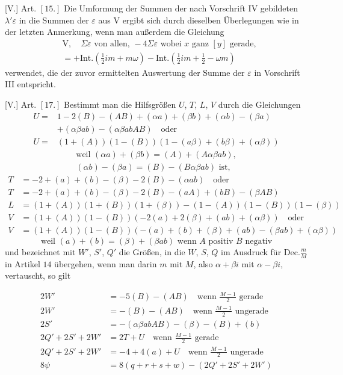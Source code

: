 [V.] Art. $[15.]$ Die Umformung der Summen der nach Vorschrift IV gebildeten $\lambda'\varepsilon$ in die Summen der $\varepsilon$ aus V ergibt sich durch dieselben Überlegungen wie in der letzten Anmerkung, wenn man außerdem die Gleichung
\[
\begin{aligned}
&\mathrm V,\quad\Sigma\varepsilon\text{ von allen, }-4\Sigma\varepsilon\text{ wobei }x\text{ ganz }[y]\text{ gerade},\\
&=+\mathrm{Int.}(\tfrac12im+m\omega)-\mathrm{Int.}(\tfrac12im+\tfrac12-\omega m)
\end{aligned}
\]
verwendet, die der zuvor ermittelten Auswertung der Summe der $\varepsilon$ in Vorschrift III entspricht.

[V.] Art. $[17.]$ Bestimmt man die Hilfsgrößen $U$, $T$, $L$, $V$ durch die Gleichungen
\[
\begin{aligned}
U={}&1-2(B)-(AB)+(\alpha a)+(\beta b)+(\alpha b)-(\beta a)\\
&+(\alpha\beta ab)-(\alpha\beta abAB)\quad\text{oder}\\
U={}&(1+(A))(1-(B))(1-(a\beta)+(b\beta)+(\alpha\beta))
\end{aligned}
\]
\[
\begin{gathered}
\text{weil }(\alpha a)+(\beta b)=(A)+(A\alpha\beta ab),\\
(\alpha b)-(\beta a)=(B)-(B\alpha\beta ab)\text{ ist},
\end{gathered}
\]
\[
\begin{aligned}
T&=-2+(a)+(b)-(\beta)-2(B)-(\alpha ab)\quad\text{oder}\\
T&=-2+(a)+(b)-(\beta)-2(B)-(aA)+(bB)-(\beta AB)\\
L&=(1+(A))(1+(B))(1+(\beta))-(1-(A))(1-(B))(1-(\beta))\\
V&=(1+(A))(1-(B))(-2(a)+2(\beta)+(ab)+(\alpha\beta))\quad\text{oder}\\
V&=(1+(A))(1-(B))(-(a)+(b)+(\beta)+(ab)-(\beta ab)+(\alpha\beta))
\end{aligned}
\]
\[
\text{weil }(a)+(b)=(\beta)+(\beta ab)\text{ wenn }A\text{ positiv }B\text{ negativ}
\]
und bezeichnet mit $W'$, $S'$, $Q'$ die Größen, in die $W$, $S$, $Q$ im Ausdruck für $\mathrm{Dec.}\frac mM$ in Artikel $14$ übergehen, wenn man darin $m$ mit $M$, also $\alpha+\beta i$ mit $\alpha-\beta i$, vertauscht, so gilt

\[
\begin{aligned}
2W'&=-5(B)-(AB)\quad\text{wenn }\frac{M-1}{2}\text{ gerade}\\
2W'&=-(B)-(AB)\quad\text{wenn }\frac{M-1}{2}\text{ ungerade}\\
2S'&=-(\alpha\beta abAB)-(\beta)-(B)+(b)\\
2Q'+2S'+2W'&=2T+U\quad\text{wenn }\frac{M-1}{2}\text{ gerade}\\
2Q'+2S'+2W'&=-4+4(a)+U\quad\text{wenn }\frac{M-1}{2}\text{ ungerade}\\
8\psi&=8(q+r+s+w)-(2Q'+2S'+2W')
\end{aligned}
\]

